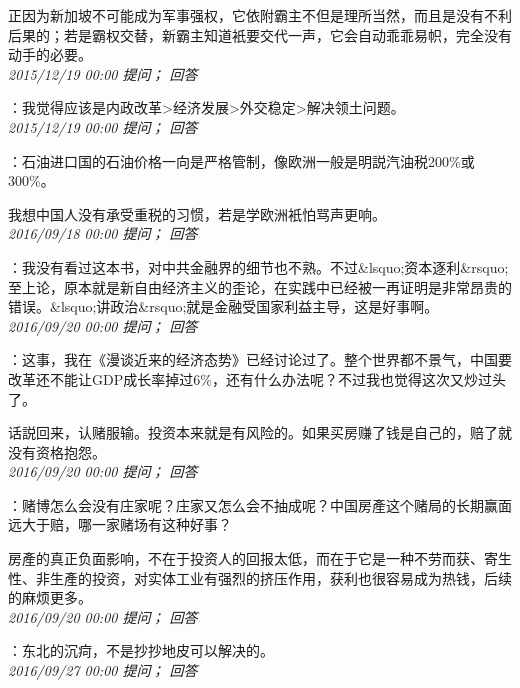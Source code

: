 \documentclass[twocolumn]{ctexart}
\begin{document}
正因为新加坡不可能成为军事强权，它依附霸主不但是理所当然，而且是没有不利后果的；若是霸权交替，新霸主知道衹要交代一声，它会自动乖乖易帜，完全没有动手的必要。\\

\textit{\hfill\noindent\small 2015/12/19 00:00 提问； 回答}

：我觉得应该是内政改革>经济发展>外交稳定>解决领土问题。\\

\textit{\hfill\noindent\small 2015/12/19 00:00 提问； 回答}

：石油进口国的石油价格一向是严格管制，像欧洲一般是明説汽油税200\%或300\%。

我想中国人没有承受重税的习惯，若是学欧洲衹怕骂声更响。\\

\textit{\hfill\noindent\small 2016/09/18 00:00 提问； 回答}

：我没有看过这本书，对中共金融界的细节也不熟。不过\&lsquo;资本逐利\&rsquo;至上论，原本就是新自由经济主义的歪论，在实践中已经被一再证明是非常昂贵的错误。\&lsquo;讲政治\&rsquo;就是金融受国家利益主导，这是好事啊。\\

\textit{\hfill\noindent\small 2016/09/20 00:00 提问； 回答}

：这事，我在《漫谈近来的经济态势》已经讨论过了。整个世界都不景气，中国要改革还不能让GDP成长率掉过6\%，还有什么办法呢？不过我也觉得这次又炒过头了。

话説回来，认赌服输。投资本来就是有风险的。如果买房赚了钱是自己的，赔了就没有资格抱怨。\\

\textit{\hfill\noindent\small 2016/09/20 00:00 提问； 回答}

：赌博怎么会没有庄家呢？庄家又怎么会不抽成呢？中国房產这个赌局的长期赢面远大于赔，哪一家赌场有这种好事？

房產的真正负面影响，不在于投资人的回报太低，而在于它是一种不劳而获、寄生性、非生產的投资，对实体工业有强烈的挤压作用，获利也很容易成为热钱，后续的麻烦更多。\\

\textit{\hfill\noindent\small 2016/09/20 00:00 提问； 回答}

：东北的沉疴，不是抄抄地皮可以解决的。\\

\textit{\hfill\noindent\small 2016/09/27 00:00 提问； 回答}
\end{document}
